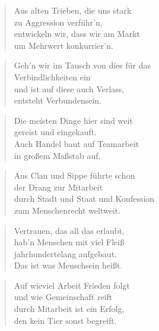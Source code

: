 \documentclass[10pt,a4paper]{article}
\begin{document}
\begin{paracol}{2}
\begin{verse}
Aus alten Trieben, die uns stark \\
zu Aggression verführ’n, \\
entwickeln wir, dass wir am Markt \\
um Mehrwert konkurrier’n. \\
\end{verse}

\begin{verse}
Geh’n wir im Tausch von dies für das \\
Verbindlichkeiten ein \\
und ist auf diese auch Verlass, \\
entsteht Verbundensein. \\
\end{verse}

\begin{verse}
Die meisten Dinge hier sind weit \\
gereist und eingekauft. \\
Auch Handel baut auf Teamarbeit \\
in großem Maßstab auf. \\
\end{verse}

\begin{verse}
Aus Clan und Sippe führte schon \\
der Drang zur Mitarbeit \\
durch Stadt und Staat und Konfession \\
zum Menschenrecht weltweit. \\
\end{verse}

\begin{verse}
Vertrauen, das all das erlaubt, \\
hab’n Menschen mit viel Fleiß \\
jahrhundertelang aufgebaut. \\
Das ist was Menschsein heißt. \\
\end{verse}

\begin{verse}
Auf wieviel Arbeit Frieden folgt \\
und wie Gemeinschaft reift \\
durch Mitarbeit ist ein Erfolg, \\
den kein Tier sonst begreift. \\
\end{verse}


\end{paracol}
\end{document}

